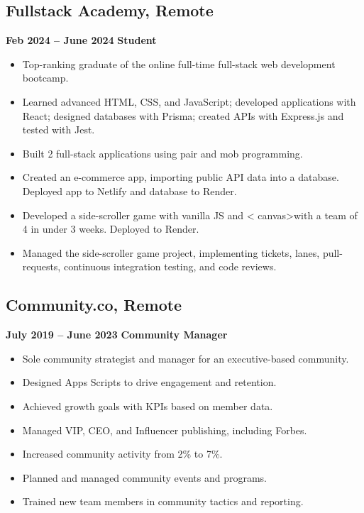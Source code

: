 \documentclass[a4paper,10pt]{article}
\begin{document}
\begin{flushleft}
    \subsection{Fullstack Academy, Remote} \hfill \textbf{Feb 2024 – June 2024}
    \textbf{Student}
    \begin{itemize}[leftmargin=0.5em]
        \item Top-ranking graduate of the online full-time full-stack web
              development bootcamp.
        \item Learned advanced HTML, CSS, and JavaScript; developed
              applications
              with React; designed databases with Prisma; created APIs with
              Express.js and
              tested with Jest.
        \item Built 2 full-stack applications using pair and mob programming.
        \item Created an e-commerce app, importing public API data into a
              database.
              Deployed app to Netlify and database to Render.
        \item Developed a side-scroller game with vanilla JS and \textless
              canvas\textgreater with a team of 4 in under 3 weeks. Deployed to
              Render.
        \item Managed the side-scroller game project, implementing tickets,
              lanes,
              pull-requests, continuous integration testing, and code reviews.
    \end{itemize}

    \subsection{Community.co, Remote} \hfill \textbf{July 2019 – June 2023}
    \textbf{Community Manager}
    \begin{itemize}[leftmargin=0.5em]
        \item Sole community strategist and manager for an executive-based
              community.
        \item Designed Apps Scripts to drive engagement and retention.
        \item Achieved growth goals with KPIs based on member data.
        \item Managed VIP, CEO, and Influencer publishing, including Forbes.
        \item Increased community activity from 2\% to 7\%.
        \item Planned and managed community events and programs.
        \item Trained new team members in community tactics and reporting.
    \end{itemize}


\end{flushleft}
\end{document}
